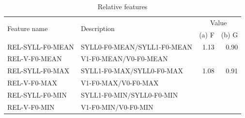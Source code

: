 		\begin{table}[h!]
		
		\ContinuedFloat
		\caption[Features computed for fundamental frequency (F0) analysis (cont.)]{(continued) Features computed for fundamental frequency (F0) analysis, and their values for the sample utterances of ``Flagge'' in \cref{fig:featuresexample}.%
		}
		{\renewcommand{\arraystretch}{1.25}%
		\begin{subtable}[h]{\textwidth}
		\caption{Relative features}
		\begin{tabularx}{\textwidth}{p{}Xrr}
		\toprule
		\multirow{2}{*}{Feature name} 
									& \multirow{2}{*}{Description}
													& \multicolumn{2}{c}{Value} \\						
					  				&							&  (a) F		& (b) G
					  																																\\
		\midrule
		REL-SYLL-F0-MEAN & SYLL0-F0-MEAN$/$SYLL1-F0-MEAN 	& 1.13    & 0.90 \\
		REL-V-F0-MEAN & V1-F0-MEAN$/$V0-F0-MEAN &  \color{red}{TD}	& \color{red}{TD}\\
		REL-SYLL-F0-MAX & SYLL1-F0-MAX$/$SYLL0-F0-MAX 			& 1.08		& 0.91 \\
		REL-V-F0-MAX & V1-F0-MAX$/$V0-F0-MAX &  \color{red}{TD}	& \color{red}{TD}\\
		REL-SYLL-F0-MIN & SYLL1-F0-MIN$/$SYLL0-F0-MIN &\color{red}{TD}&\color{red}{TD}\\
		REL-V-F0-MIN & V1-F0-MIN$/$V0-F0-MIN &  \color{red}{TD}	& \color{red}{TD}\\
		

\end{tabularx}
\end{subtable}}
\end{table}
